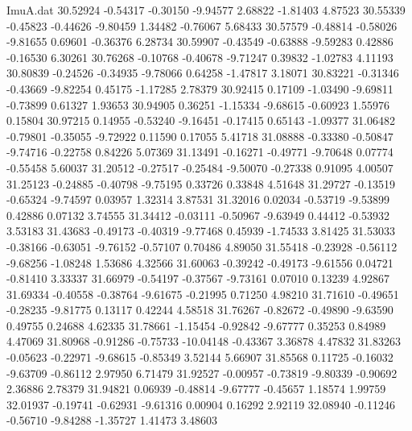 \begin{filecontents}{ImuA.dat}
  30.52924   -0.54317   -0.30150   -9.94577    2.68822   -1.81403    4.87523
  30.55339   -0.45823   -0.44626   -9.80459    1.34482   -0.76067    5.68433
  30.57579   -0.48814   -0.58026   -9.81655    0.69601   -0.36376    6.28734
  30.59907   -0.43549   -0.63888   -9.59283    0.42886   -0.16530    6.30261
  30.76268   -0.10768   -0.40678   -9.71247    0.39832   -1.02783    4.11193
  30.80839   -0.24526   -0.34935   -9.78066    0.64258   -1.47817    3.18071
  30.83221   -0.31346   -0.43669   -9.82254    0.45175   -1.17285    2.78379
  30.92415    0.17109   -1.03490   -9.69811   -0.73899    0.61327    1.93653
  30.94905    0.36251   -1.15334   -9.68615   -0.60923    1.55976    0.15804
  30.97215    0.14955   -0.53240   -9.16451   -0.17415    0.65143   -1.09377
  31.06482   -0.79801   -0.35055   -9.72922    0.11590    0.17055    5.41718
  31.08888   -0.33380   -0.50847   -9.74716   -0.22758    0.84226    5.07369
  31.13491   -0.16271   -0.49771   -9.70648    0.07774   -0.55458    5.60037
  31.20512   -0.27517   -0.25484   -9.50070   -0.27338    0.91095    4.00507
  31.25123   -0.24885   -0.40798   -9.75195    0.33726    0.33848    4.51648
  31.29727   -0.13519   -0.65324   -9.74597    0.03957    1.32314    3.87531
  31.32016    0.02034   -0.53719   -9.53899    0.42886    0.07132    3.74555
  31.34412   -0.03111   -0.50967   -9.63949    0.44412   -0.53932    3.53183
  31.43683   -0.49173   -0.40319   -9.77468    0.45939   -1.74533    3.81425
  31.53033   -0.38166   -0.63051   -9.76152   -0.57107    0.70486    4.89050
  31.55418   -0.23928   -0.56112   -9.68256   -1.08248    1.53686    4.32566
  31.60063   -0.39242   -0.49173   -9.61556    0.04721   -0.81410    3.33337
  31.66979   -0.54197   -0.37567   -9.73161    0.07010    0.13239    4.92867
  31.69334   -0.40558   -0.38764   -9.61675   -0.21995    0.71250    4.98210
  31.71610   -0.49651   -0.28235   -9.81775    0.13117    0.42244    4.58518
  31.76267   -0.82672   -0.49890   -9.63590    0.49755    0.24688    4.62335
  31.78661   -1.15454   -0.92842   -9.67777    0.35253    0.84989    4.47069
  31.80968   -0.91286   -0.75733  -10.04148   -0.43367    3.36878    4.47832
  31.83263   -0.05623   -0.22971   -9.68615   -0.85349    3.52144    5.66907
  31.85568    0.11725   -0.16032   -9.63709   -0.86112    2.97950    6.71479
  31.92527   -0.00957   -0.73819   -9.80339   -0.90692    2.36886    2.78379
  31.94821    0.06939   -0.48814   -9.67777   -0.45657    1.18574    1.99759
  32.01937   -0.19741   -0.62931   -9.61316    0.00904    0.16292    2.92119
  32.08940   -0.11246   -0.56710   -9.84288   -1.35727    1.41473    3.48603

\end{filecontents}
